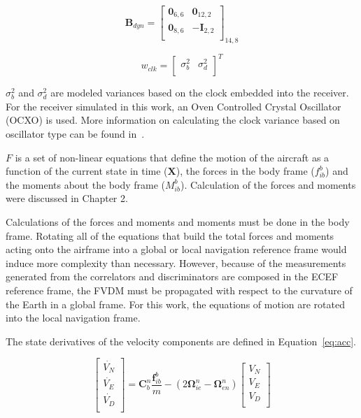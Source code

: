 \begin{equation}\label{eq:Bclk}
    \mathbf{B}_{dyn} =\begin{bmatrix}
        \mathbf{0}_{6,6} & \mathbf{0}_{12,2} \\
        \mathbf{0}_{8,6} & -\mathbf{I}_{2,2} \\
    \end{bmatrix}_{14,8}
\end{equation}

\begin{equation}\label{eq:wClk}
    w_{clk} = \begin{bmatrix}
        \sigma^2_b & \sigma^2_d \\
    \end{bmatrix}^T
\end{equation}

\(\sigma^2_b\) and \(\sigma^2_d\) are modeled variances based on the clock embedded into the receiver. For the receiver simulated in this work, an Oven Controlled Crystal Oscillator (OCXO) is used. More information on calculating the clock variance based on oscillator type can be found in~\cite{Introduction_to_Random_Signals_and_Applied_Kalman_Filtering4th_editionPdf}.

\(F\) is a set of non-linear equations that define the motion of the aircraft as a function of the current state in time (\(\mathbf{X}\)), the forces in the body frame (\(f_{ib}^b\)) and the moments about the body frame (\(M_{ib}^b\)). Calculation of the forces and moments were discussed in Chapter 2.

Calculations of the forces and moments and moments must be done in the body frame. Rotating all of the equations that build the total forces and moments acting onto the airframe into a global or local navigation reference frame would induce more complexity than necessary. However, because of the measurements generated from the correlators and discriminators are composed in the ECEF reference frame, the FVDM must be propagated with respect to the curvature of the Earth in a global frame. For this work, the equations of motion are rotated into the local navigation frame.

The state derivatives of the velocity components are defined in Equation~\ref{eq:acc}.

\begin{equation}\label{eq:acc}
    \begin{bmatrix}
        \dot{V_N} \\
        \dot{V_E} \\
        \dot{V_D} \\
    \end{bmatrix} =
    \mathbf{C}_{b}^{n}\frac{\mathbf{f}_{ib}^b}{m} - \left(2\mathbf{\Omega}_{ie}^n - \mathbf{\Omega}_{en}^n\right)
    \begin{bmatrix}
        V_N \\
        V_E \\
        V_D \\
    \end{bmatrix}
\end{equation}


